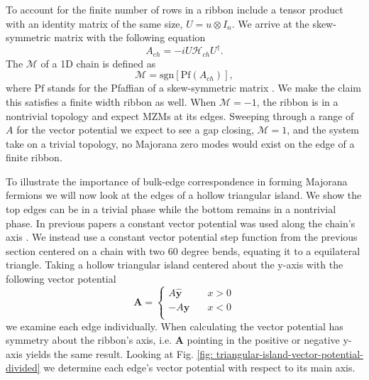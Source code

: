 \documentclass[aps,prb,showpacs,amsmath,twocolumn,amssymb,superscriptaddress]{revtex4-2}
\let\oldhat\hat
\renewcommand{\hat}[1]{\oldhat{\mathbf{#1}}}
\renewcommand{\vec}[1]{\mathbf{#1}}
\newcommand{\ham}{\mathcal{H}}
\begin{document}
To account for the finite number of rows in a ribbon include a tensor product with an identity matrix of the same size, $U = u \otimes I_n$.
We arrive at the skew-symmetric matrix with the following equation
\begin{equation}
  A_{ch} = -i U \ham_{ch} U^{\dagger}.
\end{equation}
The $\mathcal{M}$ of a 1D chain is defined as
\begin{equation}
  \mathcal{M} = \text{sgn}[\text{Pf}(A_{ch})],
\end{equation}
where $\text{Pf}$ stands for the Pfaffian of a skew-symmetric matrix \cite{kitaevUnpairedMajoranaFermions2001}.
We make the claim this satisfies a finite width ribbon as well.
When $\mathcal{M} = -1$, the ribbon is in a nontrivial topology and expect MZMs at its edges.
Sweeping through a range of $A$ for the vector potential we expect to see a gap closing, $\mathcal{M} = 1$, and the system take on a trivial topology, no Majorana zero modes would exist on the edge of a finite ribbon.

To illustrate the importance of bulk-edge correspondence in forming Majorana fermions we will now look at the edges of a hollow triangular island.
We show the top edges can be in a trivial phase while the bottom remains in a nontrivial phase.
In previous papers a constant vector potential was used along the chain's axis \cite{romitoManipulatingMajoranaFermions2012, takasanSupercurrentinducedTopologicalPhase2022}.
We instead use a constant vector potential step function from the previous section centered on a chain with two 60 degree bends, equating it to a equilateral triangle.
Taking a hollow triangular island centered about the y-axis with the following vector potential
\begin{equation}
  \vec{A} = \begin{cases}
            A \hat{y} \quad &x > 0 \\
            -A \hat{y} \quad &x < 0 \\
            \end{cases}
\end{equation}
we examine each edge individually.
When calculating  the vector potential has symmetry about the ribbon's axis, i.e. $\vec{A}$ pointing in the positive or negative y-axis yields the same result.
Looking at Fig. \ref{fig: triangular-island-vector-potential-divided} we determine each edge's vector potential with respect to its main axis.
\end{document}
